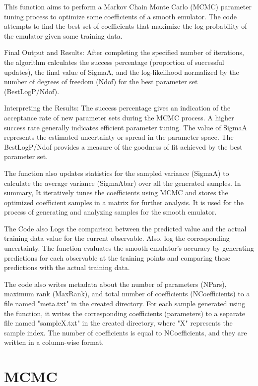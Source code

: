 \documentclass[12pt]{article}
\numberwithin{equation}{section}
\numberwithin{figure}{section}
\begin{document}
This function aims to perform a Markov Chain Monte Carlo (MCMC) parameter tuning process to optimize some coefficients of a smooth emulator. The code attempts to find the best set of coefficients that maximize the log probability of the emulator given some training data. 

Final Output and Results:
After completing the specified number of iterations, the algorithm calculates the success percentage (proportion of successful updates), the final value of SigmaA, and the log-likelihood normalized by the number of degrees of freedom (Ndof) for the best parameter set (BestLogP/Ndof).  

Interpreting the Results:
The success percentage gives an indication of the acceptance rate of new parameter sets during the MCMC process. A higher success rate generally indicates efficient parameter tuning. The value of SigmaA represents the estimated uncertainty or spread in the parameter space. The BestLogP/Ndof provides a measure of the goodness of fit achieved by the best parameter set. 

The function also updates statistics for the sampled variance (SigmaA) to calculate the average variance (SigmaAbar) over all the generated samples. In summary, It iteratively tunes the coefficients using MCMC and stores the optimized coefficient samples in a matrix for further analysis. It is used for the process of generating and analyzing samples for the smooth emulator.

The Code also Logs the comparison between the predicted value and the actual training data value for the current observable. Also, log the corresponding uncertainty. The function evaluates the smooth emulator's accuracy by generating predictions for each observable at the training points and comparing these predictions with the actual training data.  

The code also writes metadata about the number of parameters (NPars), maximum rank (MaxRank), and total number of coefficients (NCoefficients) to a file named "meta.txt" in the created directory. For each sample generated using the function, it writes the corresponding coefficients (parameters) to a separate file named "sampleX.txt" in the created directory, where "X" represents the sample index. The number of coefficients is equal to NCoefficients, and they are written in a column-wise format. 


\section{MCMC}
\end{document}
